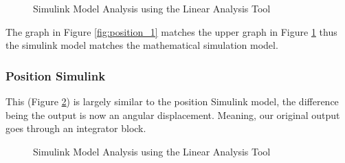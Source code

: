    \begin{figure}[H]
\centering
{}
\caption{\label{fig:position_2} Simulink Model Analysis using the Linear Analysis Tool}
\end{figure}

The graph in Figure \ref{fig:position_1} matches the upper graph in Figure \ref{fig:position_2} thus the simulink model matches the mathematical simulation model.

	\subsubsection{Position Simulink}
    
    This (Figure \ref{fig:position_3}) is largely similar to the position Simulink model, the difference being the output is now an angular displacement. Meaning, our original output goes through an integrator block. 
\begin{figure}[H]
\centering
{}
\caption{\label{fig:position_3} Simulink Model Analysis using the Linear Analysis Tool}
\end{figure}
    
